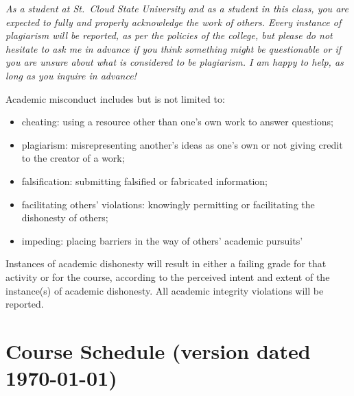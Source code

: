 \documentclass{tufte-handout}
\begin{document}
\begin{fullwidth}


\emph{As a student at St.\ Cloud State University and as a student in this class, you are expected to fully and properly acknowledge the work of others. Every instance of plagiarism will be reported, as per the policies of the college, but please do not hesitate to ask me in advance if you think something might be questionable or if you are unsure about what is considered to be plagiarism. I am happy to help, as long as you inquire in advance! }

Academic misconduct includes but is not limited to:

\begin{itemize}
	\item cheating: using a resource other than one's own work to answer questions;
	\item plagiarism: misrepresenting another's ideas as one's own or not giving credit to the creator of a work;
	\item falsification: submitting falsified or fabricated information;
	\item facilitating others' violations: knowingly permitting or facilitating the dishonesty of others;
	\item impeding: placing barriers in the way of others' academic pursuits'
\end{itemize}

Instances of academic dishonesty will result in either a failing grade for that activity or for the course, according to the perceived intent and extent of the instance(s) of academic dishonesty.
All academic integrity violations will be reported.





\newpage

\section{Course Schedule (version dated \today)}




\end{fullwidth}
\end{document}
